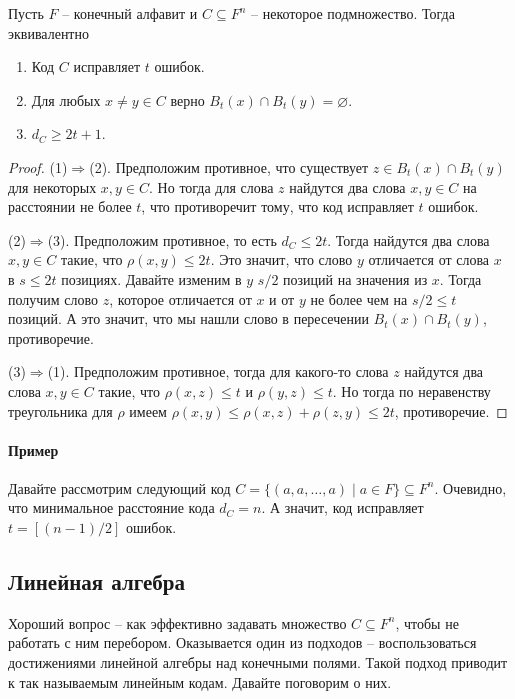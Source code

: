 \begin{claim}
Пусть $F$ -- конечный алфавит и $C\subseteq F^n$ -- некоторое подмножество.
Тогда эквивалентно
\begin{enumerate}
\item Код $C$ исправляет $t$ ошибок.

\item Для любых $x\neq y\in C$ верно $B_t(x)\cap B_t(y) = \varnothing$.

\item $d_C \geqslant 2t + 1$.
\end{enumerate}
\end{claim}
\begin{proof}
(1)$\Rightarrow$(2).
Предположим противное, что существует $z\in B_t(x) \cap B_t(y)$ для некоторых $x,y\in C$.
Но тогда для слова $z$ найдутся два слова $x,y\in C$ на расстоянии не более $t$, что противоречит тому, что код исправляет $t$ ошибок.

(2)$\Rightarrow$(3).
Предположим противное, то есть $d_C \leqslant 2t$.
Тогда найдутся два слова $x,y\in C$ такие, что $\rho(x, y) \leqslant 2t$.
Это значит, что слово $y$ отличается от слова $x$ в $s\leqslant 2t$ позициях.
 Давайте изменим в $y$ $s/2$ позиций на значения из $x$.
Тогда получим слово $z$, которое отличается от $x$ и от $y$ не более чем на $s/2 \leqslant t$ позиций.
 А это значит, что мы нашли слово в пересечении $B_t(x) \cap B_t(y)$, противоречие.

(3)$\Rightarrow$(1).
Предположим противное, тогда для какого-то слова $z$ найдутся два слова $x,y\in C$ такие, что $\rho(x,z) \leqslant t$ и $\rho(y,z) \leqslant t$.
Но тогда по неравенству треугольника для $\rho$ имеем $\rho(x,y) \leqslant \rho(x,z)+ \rho (z,y) \leqslant 2t$, противоречие.
\end{proof}

\paragraph{Пример}

Давайте рассмотрим следующий код $C = \{(a, a, \ldots, a)\mid a\in F\}\subseteq F^n$.
Очевидно, что минимальное расстояние кода $d_C = n$.
А значит, код исправляет $t = [(n-1)/2]$ ошибок.

\subsection{Линейная алгебра}

Хороший вопрос -- как эффективно задавать множество $C\subseteq F^n$, чтобы не работать с ним перебором.
Оказывается один из подходов -- воспользоваться достижениями линейной алгебры над конечными полями.
Такой подход приводит к так называемым линейным кодам.
Давайте поговорим о них.

